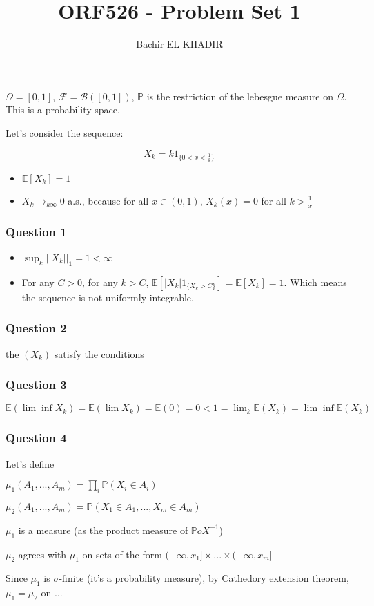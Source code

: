 \documentclass[12pt]{article}
\title{ORF526 - Problem Set 1}
\author{Bachir EL KHADIR }
\newcommand{\Q}[1]{\subsubsection*{Question #1}}
\begin{document}
\maketitle



$\Omega = [0, 1]$, $\mathcal F = \mathcal B([0, 1])$, $\mathbb{P}$ is the restriction of the lebesgue measure on $\Omega$. This is a probability space.


Let's consider the sequence:

$$X_k = k 1_{\{0 < x < \frac 1 k\}}$$


\begin{itemize}
\item $\mathbb{E}[X_k] = 1$
\item $X_k \rightarrow_{k \infty} 0$ a.s., because for all $x \in (0,1)$, $X_k(x) = 0$ for all $k > \frac{1}{x}$
\end{itemize}

\Q{1} 

\begin{itemize}
\item $\sup_k ||X_k||_1 = 1 < \infty$
\item For any $C > 0$, for any $k > C$, $\mathbb{E}[|X_k| 1_{\{X_k > C\}}] = \mathbb{E}[X_k] = 1$. Which means the sequence is not uniformly integrable.
\end{itemize}

\Q{2}
the $(X_k)$ satisfy the conditions

\Q{3}
$\mathbb{E}(\lim \inf X_k) = \mathbb{E}(\lim X_k) = \mathbb{E}(0) = 0 < 1 = \lim_k \mathbb{E}(X_k) = \lim \inf \mathbb{E}(X_k)$


\Q{4}

Let's define 

$\mu_1(A_1, ..., A_m) = \prod_i \mathbb{P}(X_i \in A_i)$

$\mu_2(A_1, ..., A_m) = \mathbb{P}(X_1 \in A_1,...,X_m \in A_m)$

$\mu_1$ is a measure (as the product measure of $\mathbb{P}oX^{-1}$)

$\mu_2$ agrees with $\mu_1$ on sets of the form $(-\infty, x_1] \times ... \times (-\infty, x_m]$


Since $\mu_1$ is $\sigma$-finite (it's a probability measure), by Cathedory extension theorem, $\mu_1 = \mu_2$ on ...
\end{document}
